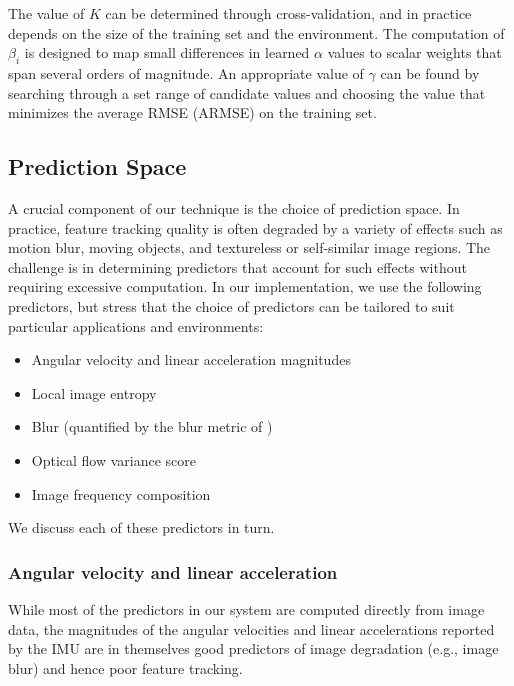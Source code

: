 The value of $K$ can be determined through cross-validation, and in practice depends on the size of the training set and the environment.
The computation of $\beta_i$ is designed to map small differences in learned $\alpha$ values to scalar weights that span several orders of magnitude.
An appropriate value of $\gamma$ can be found by searching through a set range of candidate values and choosing the value that minimizes the average RMSE (ARMSE) on the training set.


\subsection{Prediction Space} \label{sec:predictors}
A crucial component of our technique is the choice of prediction space.
In practice, feature tracking quality is often degraded by a variety of effects such as motion blur, moving objects, and textureless or self-similar image regions.
The challenge is in determining predictors that account for such effects without requiring excessive computation.
In our implementation, we use the following predictors, but stress that the choice of predictors can be tailored to suit particular applications and environments:
\begin{itemize}
    \item Angular velocity and linear acceleration magnitudes
    \item Local image entropy
    \item Blur (quantified by the blur metric of \cite{crete2007blur})
    \item Optical flow variance score
    \item Image frequency composition
\end{itemize}
We discuss each of these predictors in turn.


\subsubsection{Angular velocity and linear acceleration}
While most of the predictors in our system are computed directly from image data, the magnitudes of the angular velocities and linear accelerations reported by the IMU are in themselves good predictors of image degradation (e.g., image blur) and hence poor feature tracking. 

